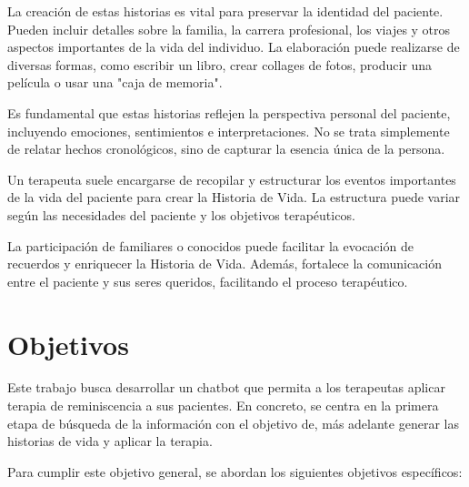 La creación de estas historias es vital para preservar la identidad del paciente. Pueden incluir detalles sobre la familia, la carrera profesional, los viajes y otros aspectos importantes de la vida del individuo. La elaboración puede realizarse de diversas formas, como escribir un libro, crear collages de fotos, producir una película o usar una "caja de memoria".

Es fundamental que estas historias reflejen la perspectiva personal del paciente, incluyendo emociones, sentimientos e interpretaciones. No se trata simplemente de relatar hechos cronológicos, sino de capturar la esencia única de la persona.

Un terapeuta suele encargarse de recopilar y estructurar los eventos importantes de la vida del paciente para crear la Historia de Vida. La estructura puede variar según las necesidades del paciente y los objetivos terapéuticos.

La participación de familiares o conocidos puede facilitar la evocación de recuerdos y enriquecer la Historia de Vida. Además, fortalece la comunicación entre el paciente y sus seres queridos, facilitando el proceso terapéutico.

\section{Objetivos}
\label{sec:objetivos}
Este trabajo  busca desarrollar un chatbot que permita a los terapeutas aplicar terapia de reminiscencia a sus pacientes. En concreto, se centra en la primera etapa de búsqueda de la información con el objetivo de, más adelante generar las historias de vida y aplicar la terapia. 

Para cumplir este objetivo general, se abordan los siguientes objetivos específicos:


